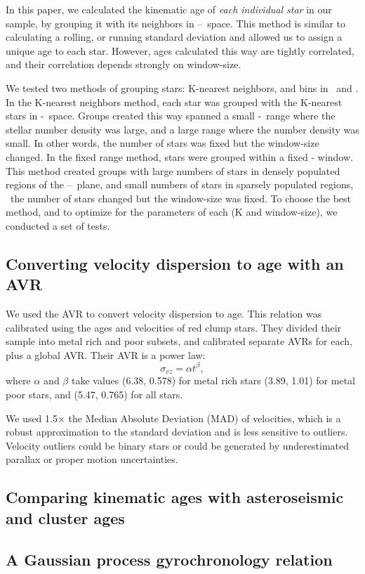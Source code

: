 In this paper, we calculated the kinematic age of {\it each individual star}
in our sample, by grouping it with its neighbors in \logp--\teff\ space.
This method is similar to calculating a rolling, or running standard
deviation and allowed us to assign a unique age to each star.
However, ages calculated this way are tightly correlated, and their
correlation depends strongly on window-size.

We tested two methods of grouping stars: K-nearest neighbors, and bins in
\logp\ and \teff .
In the K-nearest neighbors method, each star was grouped with the K-nearest
stars in \logp-\teff\ space.
Groups created this way spanned a small \logp -\teff\ range where the stellar
number density was large, and a large range where the number density was
small.
In other words, the number of stars was fixed but the window-size changed.
In the fixed range method, stars were grouped within a fixed \logp -\teff
window.
This method created groups with large numbers of stars in densely populated
regions of the \logp--\teff\ plane, and small numbers of stars in sparsely
populated regions, \ie\ the number of stars changed but the window-size was
fixed.
To choose the best method, and to optimize for the parameters of each (K and
window-size), we conducted a set of tests.

\subsection{Converting velocity dispersion to age with an AVR}
\label{sec:avr}
We used the \citet{yu2018} AVR to convert velocity dispersion to age.
This relation was calibrated using the ages and velocities of red clump stars.
They divided their sample into metal rich and poor subsets, and calibrated
separate AVRs for each, plus a global AVR.
Their AVR is a power law:
\begin{equation}
    \sigma_{vz} = \alpha t ^\beta,
\end{equation}
where $\alpha$ and $\beta$ take values (6.38, 0.578) for metal rich stars
(3.89, 1.01) for metal poor stars, and (5.47, 0.765) for all stars.

We used 1.5$\times$ the Median Absolute Deviation (MAD) of velocities, which
is a robust approximation to the standard deviation and is less sensitive to
outliers.
Velocity outliers could be binary stars or could be generated by
underestimated parallax or proper motion uncertainties.

\subsection{Comparing kinematic ages with asteroseismic and cluster ages}

\subsection{A Gaussian process gyrochronology relation}
\label{sec:gp_model}
